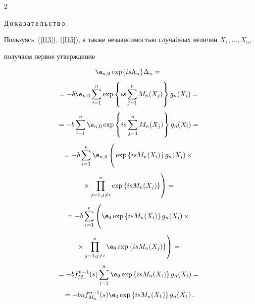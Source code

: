 \begin{multicols}{2}
\noindent


Д\,о\,к\,а\,з\,а\,т\,е\,л\,ь\,с\,т\,в\,о\,.\


 Пользуясь~(\ref{l13}), (\ref{l15}), а также независимостью случайных величин $X_1, \dots, X_n$, 


 получаем первое утверждение


 


 \noindent


\begin{multline*}


{\e}_{n,0}\exp\{is\Lambda_n\}\Delta_n ={}\\[4pt]


{}


= -b  {\e}_{n,0}\sum_{i=1}^n \exp\left\{is\sum_{j=1}^n M_n(X_j)\right\} g_n(X_i)={}\\[4pt]


{}


= -b \sum\limits_{i=1}^n {\e}_{n,0} \exp\left\{is\sum_{j=1}^n M_n(X_j)\right\} g_n(X_i) ={}\\[4pt]


{}


= -b \sum\limits_{i=1}^n {\e}_{n,0}\left(


\vphantom{\prod^n_{j=1}}


\exp\left\{isM_n(X_i)\right\} g_n(X_i) \times{}\right.\\[4pt]


\left.{}\times \prod\limits_{j=1,  j\ne i}^n \exp\left\{isM_n(X_j)\right\} \right) ={}\\[4pt]


{}


= -b \sum\limits_{i=1}^n \left(


\vphantom{\prod^n_{j=1}}


{\e}_0 \exp\left\{isM_n(X_i)\right\} g_n(X_i) \times {}\right.\\[4pt]


\left.{}\times


\prod\limits_{j=1,j\ne i}^n {\e}_0 \exp\left\{isM_n(X_j)\right\}\right) ={}\\[4pt]


{}


= -b  f_{M_n}^{n-1}(s)  \sum\limits_{i=1}^n {\e}_0 \exp\left\{isM_n(X_i)\right\} g_n(X_i) ={}\\[4pt]


{}


= -b n f^{n-1}_{M_n}(s) {\e}_0 \exp\left\{isM_n(X_1)\right\} g_n(X_1)\,.



\end{multline*}
\end{multicols}
